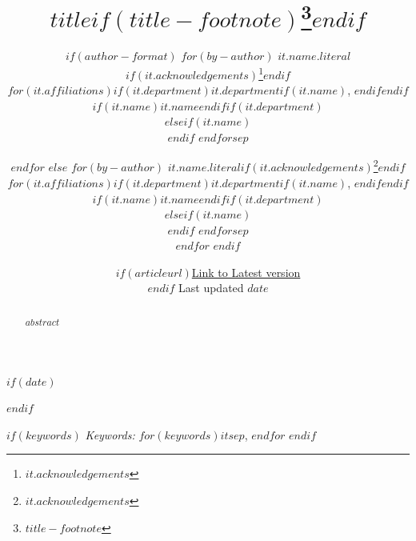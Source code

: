 %

\def\spacingset#1{\renewcommand{\baselinestretch}%
{#1}\small\normalsize} \spacingset{1}

$if(date)$
\date{$if(articleurl)$\href{$articleurl$}{Link to Latest version}\\ \vspace{1em} $endif$ Last updated $date$}
$endif$

\title{$title$$if(title-footnote)$\thanks{$title-footnote$}$endif$}
\author{
$if(author-format)$
$for(by-author)$
$it.name.literal$$if(it.acknowledgements)$\thanks{$it.acknowledgements$}$endif$\\
$for(it.affiliations)$$if(it.department)$$it.department$$if(it.name)$, $endif$$endif$$if(it.name)$$it.name$$endif$$if(it.department)$\\$elseif(it.name)$\\$endif$
$endfor$$sep$\and $endfor$
$else$
$for(by-author)$
$it.name.literal$$if(it.acknowledgements)$\thanks{$it.acknowledgements$}$endif$\\
$for(it.affiliations)$$if(it.department)$$it.department$$if(it.name)$, $endif$$endif$$if(it.name)$$it.name$$endif$$if(it.department)$\\$elseif(it.name)$\\$endif$
$endfor$$sep$\\$endfor$
$endif$}
\maketitle

\bigskip
\bigskip
\begin{abstract}
$abstract$
\end{abstract}

\bigskip
$if(keywords)$
\noindent%
{\it Keywords:} $for(keywords)$$it$$sep$, $endfor$
\vfill
$endif$

\newpage
\spacingset{1.2} %
